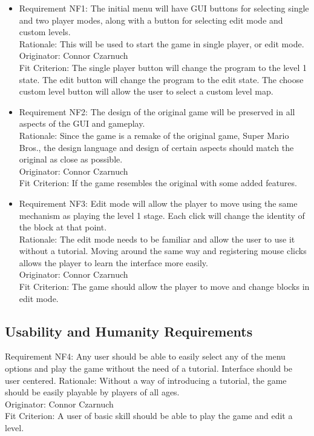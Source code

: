 \documentclass[12pt, titlepage]{article}
\begin{document}
\begin{itemize}
\item Requirement NF1: The initial menu will have GUI buttons for selecting single and two player modes, along with a button for selecting edit mode and custom levels.\\
Rationale: This will be used to start the game in single player, or edit mode.\\
Originator: Connor Czarnuch\\
Fit Criterion: The single player button will change the program to the level 1 state. The edit button will change the program to the edit state. The choose custom level button will allow the user to select a custom level map.\\

\item Requirement NF2: The design of the original game will be preserved in all aspects of the GUI and gameplay.\\
Rationale: Since the game is a remake of the original game, Super Mario Bros., the design language and design of certain aspects should match the original as close as possible.\\
Originator: Connor Czarnuch\\
Fit Criterion: If the game resembles the original with some added features.\\

\item Requirement NF3: Edit mode will allow the player to move using the same mechanism as playing the level 1 stage. Each click will change the identity of the block at that point.\\
Rationale: The edit mode needs to be familiar and allow the user to use it without a tutorial. Moving around the same way and registering mouse clicks allows the player to learn the interface more easily.\\
Originator: Connor Czarnuch\\
Fit Criterion: The game should allow the player to move and change blocks in edit mode.
 
\end{itemize}



\subsection{Usability and Humanity Requirements}

Requirement NF4: Any user should be able to easily select any of the menu options and play the game without the need of a tutorial. Interface should be user centered.
Rationale: Without a way of introducing a tutorial, the game should be easily playable by players of all ages.\\
Originator: Connor Czarnuch\\
Fit Criterion: A user of basic skill should be able to play the game and edit a level.\\
\end{document}
